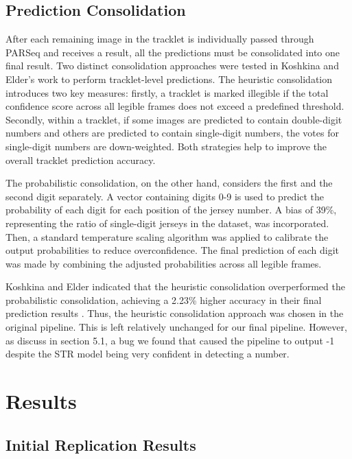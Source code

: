 \documentclass[11pt, letterpaper]{article}
\begin{document}
\subsection{Prediction Consolidation}

After each remaining image in the tracklet is individually passed through PARSeq and receives a result, all the predictions must be consolidated into one final result. Two distinct consolidation approaches were tested in Koshkina and Elder's work to perform tracklet-level predictions. The heuristic consolidation introduces two key measures: firstly, a tracklet is marked illegible if the total confidence score across all legible frames does not exceed a predefined threshold. Secondly, within a tracklet, if some images are predicted to contain double-digit numbers and others are predicted to contain single-digit numbers, the votes for single-digit numbers are down-weighted. Both strategies help to improve the overall tracklet prediction accuracy.

The probabilistic consolidation, on the other hand, considers the first and the second digit separately. A vector containing digits 0-9 is used to predict the probability of each digit for each position of the jersey number. A bias of 39\%, representing the ratio of single-digit jerseys in the dataset, was incorporated. Then, a standard temperature scaling algorithm was applied to calibrate the output probabilities to reduce overconfidence. The final prediction of each digit was made by combining the adjusted probabilities across all legible frames.

Koshkina and Elder indicated that the heuristic consolidation overperformed the probabilistic consolidation, achieving a 2.23\% higher accuracy in their final prediction results \cite{main_paper}. Thus, the heuristic consolidation approach was chosen in the original pipeline. This is left relatively unchanged for our final pipeline. However, as discuss in section 5.1, a bug we found that caused the pipeline to output -1 despite the STR model being very confident in detecting a number.

\section{Results}

\subsection{Initial Replication Results}
\end{document}
